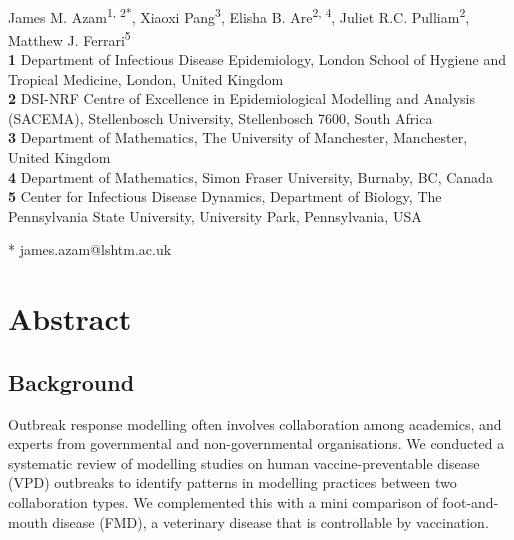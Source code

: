 \documentclass[10pt,letterpaper]{article}
\begin{document}
\vspace*{0.2in}

\begin{flushleft}
{\Large
\textbf{}
}
\newline
\\
James M. Azam\textsuperscript{1, 2*},
Xiaoxi Pang\textsuperscript{3},
Elisha B. Are\textsuperscript{2, 4},
Juliet R.C. Pulliam\textsuperscript{2},
Matthew J. Ferrari\textsuperscript{5}
\\
\bigskip
\textbf{1} Department of Infectious Disease Epidemiology, London School of Hygiene and Tropical Medicine, London, United Kingdom
\\
\textbf{2} DSI-NRF Centre of Excellence in Epidemiological Modelling and Analysis (SACEMA), Stellenbosch University, Stellenbosch 7600, South Africa
\\
\textbf{3} Department of Mathematics, The University of Manchester, Manchester, United Kingdom
\\
\textbf{4} Department of Mathematics, Simon Fraser University, Burnaby, BC, Canada
\\
\textbf{5} Center for Infectious Disease Dynamics, Department of Biology, The Pennsylvania
State University, University Park, Pennsylvania, USA
\\
\bigskip

* james.azam@lshtm.ac.uk


\end{flushleft}
\section*{Abstract}
\subsection*{Background}
Outbreak response modelling often involves collaboration among academics, and experts from governmental and non-governmental organisations. We conducted a systematic review of modelling studies on human vaccine-preventable disease (VPD) outbreaks to identify patterns in modelling practices between two collaboration types. We complemented this with a mini comparison of foot-and-mouth disease (FMD), a veterinary disease that is controllable by vaccination.   
\end{document}
